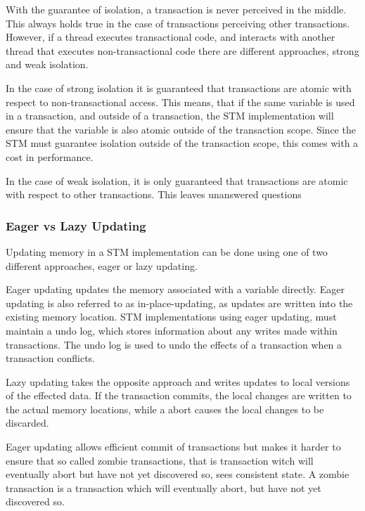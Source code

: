 With the guarantee of isolation, a transaction is never perceived in the middle. This always holds true in the case of transactions perceiving other transactions. However, if a thread executes transactional code, and interacts with another thread that executes non-transactional code there are different approaches, strong and weak isolation.

In the case of strong isolation it is guaranteed that transactions are atomic with respect to non-transactional access\cite[p. 2083]{herlihy2011tm}. This means, that if the same variable is used in a transaction, and outside of a transaction, the \ac{STM} implementation will ensure that the variable is also atomic outside of the transaction scope. Since the \ac{STM} must guarantee isolation outside of the transaction scope, this comes with a cost in performance\cite{herlihy2011tm}. 

In the case of weak isolation, it is only guaranteed that transactions are atomic with respect to other transactions. This leaves unanswered questions 

\subsubsection{Eager vs Lazy Updating}
Updating memory in a \ac{STM} implementation can be done using one of two different approaches, eager or lazy updating.

Eager updating updates the memory associated with a variable directly. Eager updating is also referred to as in-place-updating, as updates are written into the existing memory location\cite[p. 35]{afek2011lowering}. \ac{STM} implementations using eager updating, must maintain a undo log, which stores information about any writes made within transactions. The undo log is used to undo the effects of a transaction when a transaction conflicts\cite[p. 2084]{herlihy2011tm}.

Lazy updating takes the opposite approach and writes updates to local versions of the effected data\cite[p. 2084]{herlihy2011tm}. If the transaction commits, the local changes are written to the actual memory locations, while a abort causes the local changes to be discarded.

Eager updating allows efficient commit of transactions but makes it harder to ensure that so called zombie transactions, that is transaction witch will eventually abort but have not yet discovered so, sees consistent state\cite[p. 2084]{herlihy2011tm}. A zombie transaction is a transaction which will eventually abort, but have not yet discovered so.
